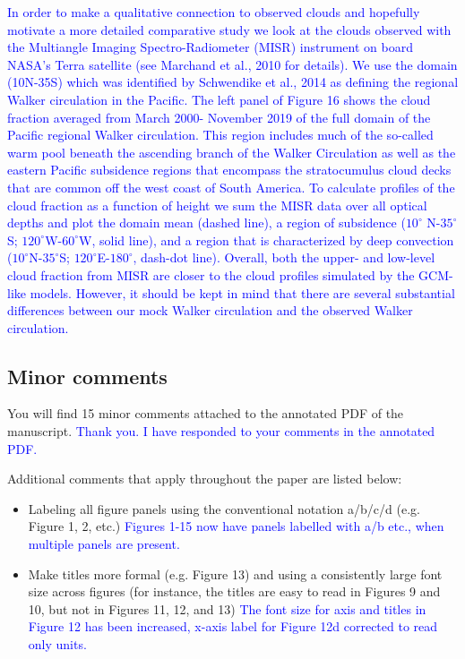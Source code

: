 \documentclass[draft]{agujournal2019}
\begin{document}
\textcolor{blue}{In order to make a qualitative connection to observed clouds and hopefully motivate a more detailed comparative 
study we look 
at the clouds observed with the Multiangle Imaging Spectro-Radiometer (MISR) instrument on board NASA's Terra satellite (see 
Marchand et al., 2010 for details).  We use the domain (10N-35S) which was identified by Schwendike et al., 2014 as defining the 
regional Walker circulation in the Pacific.  The left panel of Figure 16 shows the cloud fraction averaged from March 2000-
November 2019 of the full domain of the Pacific regional Walker circulation.  This region includes much of the so-called warm pool 
beneath the ascending branch of the Walker Circulation as well as the eastern Pacific subsidence regions that encompass the 
stratocumulus cloud decks that are common off the west coast of South America.   To calculate profiles of the cloud fraction as a 
function of height we sum the MISR data over all optical depths  and plot the domain mean (dashed line), a region of subsidence 
($10^\circ$ N-$35^\circ$S; $120^\circ$W-$60^\circ$W, solid line), and a region that is characterized by deep 
convection ($10^\circ$N-$35^\circ$S; $120^\circ$E-$180^\circ$, dash-dot line).  Overall, both the upper- and low-level cloud fraction 
from MISR are closer to the cloud profiles simulated by the GCM-like models.  However, it should be kept in mind that there are 
several substantial differences between our mock Walker circulation and the observed Walker circulation.} 

\subsection{Minor comments}

You will find 15 minor comments attached to the annotated PDF of the manuscript. 
\textcolor{blue}{Thank you.  I have responded to your comments in the annotated PDF.}

Additional comments that apply
throughout the paper are listed below:
\begin{itemize}
  \item Labeling all figure panels using the conventional notation a/b/c/d (e.g. Figure 1, 2, etc.)
  \textcolor{blue}{Figures 1-15 now have panels labelled with a/b etc., when multiple panels are present.}
  
  \item Make titles more formal (e.g. Figure 13) and using a consistently large font size across figures (for instance, the
titles are easy to read in Figures 9 and 10, but not in Figures 11, 12, and 13)
  \textcolor{blue}{The font size for axis and titles in Figure 12 has been increased, x-axis label for Figure 12d corrected to read only units.}
\end{itemize}









\end{document}
